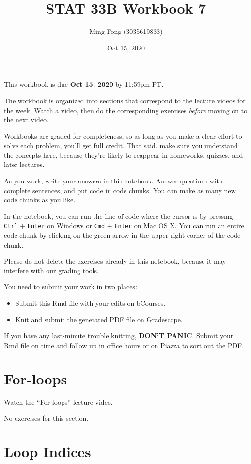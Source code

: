 \documentclass[
]{article}
\title{STAT 33B Workbook 7}
\author{Ming Fong (3035619833)}
\date{Oct 15, 2020}
\providecommand{\tightlist}{%
  \setlength{\itemsep}{0pt}\setlength{\parskip}{0pt}}
\begin{document}
\maketitle

This workbook is due \textbf{Oct 15, 2020} by 11:59pm PT.

The workbook is organized into sections that correspond to the lecture
videos for the week. Watch a video, then do the corresponding exercises
\emph{before} moving on to the next video.

Workbooks are graded for completeness, so as long as you make a clear
effort to solve each problem, you'll get full credit. That said, make
sure you understand the concepts here, because they're likely to
reappear in homeworks, quizzes, and later lectures.

As you work, write your answers in this notebook. Answer questions with
complete sentences, and put code in code chunks. You can make as many
new code chunks as you like.

In the notebook, you can run the line of code where the cursor is by
pressing \texttt{Ctrl} + \texttt{Enter} on Windows or \texttt{Cmd} +
\texttt{Enter} on Mac OS X. You can run an entire code chunk by clicking
on the green arrow in the upper right corner of the code chunk.

Please do not delete the exercises already in this notebook, because it
may interfere with our grading tools.

You need to submit your work in two places:

\begin{itemize}
\tightlist
\item
  Submit this Rmd file with your edits on bCourses.
\item
  Knit and submit the generated PDF file on Gradescope.
\end{itemize}

If you have any last-minute trouble knitting, \textbf{DON'T PANIC}.
Submit your Rmd file on time and follow up in office hours or on Piazza
to sort out the PDF.

\hypertarget{for-loops}{%
\section{For-loops}\label{for-loops}}

Watch the ``For-loops'' lecture video.

No exercises for this section.

\hypertarget{loop-indices}{%
\section{Loop Indices}\label{loop-indices}}
\end{document}
